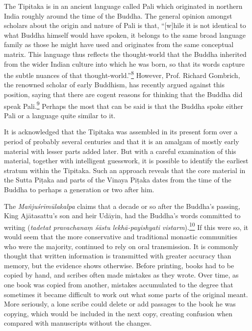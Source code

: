 The Tipitaka is in an ancient language called Pali which originated in
northern India roughly around the time of the Buddha. The general
opinion amongst scholars about the origin and nature of Pali is that,
``{[}w{]}hile it is not identical to what Buddha himself would have
spoken, it belongs to the same broad language family as those he might
have used and originates from the same conceptual matrix. This language
thus reflects the thought-world that the Buddha inherited from the wider
Indian culture into which he was born, so that its words capture the
subtle nuances of that
thought-world.''\label{footprints_split_005.html_fnref8}\hyperref[footprints_split_024.htmlux5cux23fn8]{\textsuperscript{8}}
However, Prof. Richard Gombrich, the renowned scholar of early Buddhism,
has recently argued against this position, saying that there are cogent
reasons for thinking that the Buddha did speak
Pali.\label{footprints_split_005.html_fnref9}\hyperref[footprints_split_024.htmlux5cux23fn9]{\textsuperscript{9}}
Perhaps the most that can be said is that the Buddha spoke either Pali
or a language quite similar to it.

It is acknowledged that the Tipitaka was assembled in its present form
over a period of probably several centuries and that it is an amalgam of
mostly early material with lesser parts added later. But with a careful
examination of this material, together with intelligent guesswork, it is
possible to identify the earliest stratum within the Tipitaka. Such an
approach reveals that the core material in the Sutta Piṭaka and parts of
the Vinaya Piṭaka dates from the time of the Buddha to perhaps a
generation or two after him.

The \emph{Mañjuśrīmūlakalpa} claims that a decade or so after the
Buddha's passing, King Ajātasattu's son and heir Udāyin, had the
Buddha's words committed to writing (\emph{tadetat pravachanaṃ śāstu
lekhā-payishyati
vistarm}).\label{footprints_split_005.html_fnref10}\hyperref[footprints_split_024.htmlux5cux23fn10]{\textsuperscript{10}}
If this were so, it would seem that the more conservative and
traditional monastic communities who were the majority, continued to
rely on oral transmission. It is commonly thought that written
information is transmitted with greater accuracy than memory, but the
evidence shows otherwise. Before printing, books had to be copied by
hand, and scribes often made mistakes as they wrote. Over time, as one
book was copied from another, mistakes accumulated to the degree that
sometimes it became difficult to work out what some parts of the
original meant. More seriously, a lone scribe could delete or add
passages to the book he was copying, which would be included in the next
copy, creating confusion when compared with manuscripts without the
changes.

